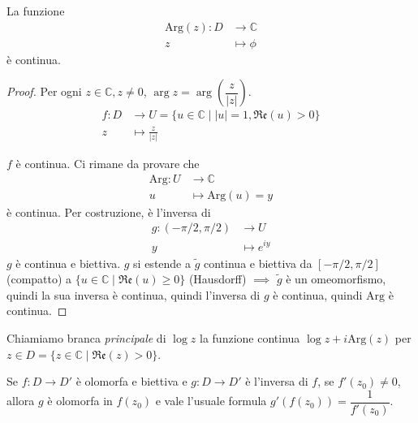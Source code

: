 \begin{prop}
  La funzione
  \begin{align*}
    \text{Arg}(z):D &\longrightarrow \mathbb{C}\\
    z &\longmapsto \phi
  \end{align*}
  è continua.
\end{prop}

\begin{proof}
  Per ogni $z \in \mathbb{C}, z \not=0$, $\arg{z}=\arg{\left(\dfrac{z}{|z|}\right)}$.
  \begin{align*}
    f:D &\longrightarrow U=\{u \in \mathbb{C} \mid |u|=1, \mathfrak{Re}(u)>0\}\\
    z &\longmapsto \frac{z}{|z|}
  \end{align*}
  \begin{center}
  \end{center}
  $f$ è continua. Ci rimane da provare che
  \begin{align*}
    \text{Arg}:U &\longrightarrow \mathbb{C}\\
    u &\longmapsto \text{Arg}(u)=y
  \end{align*}
  è continua.
  Per costruzione, è l'inversa di
  \begin{align*}
    g:(-\pi/2, \pi/2) &\longrightarrow U\\
    y &\longmapsto e^{iy}
  \end{align*}
  $g$ è continua e biettiva. $g$ si estende a $\tilde{g}$ continua e biettiva da $[-\pi/2, \pi/2]$ (compatto) a $\{u \in \mathbb{C} \mid \mathfrak{Re}(u) \ge 0\}$ (Hausdorff) $\implies$ $\tilde{g}$ è un omeomorfismo, quindi la sua inversa è continua, quindi l'inversa di $g$ è continua, quindi $\text{Arg}$ è continua.
\end{proof}

\begin{defn}
  Chiamiamo branca \textit{principale} di $\log{z}$ la funzione continua $\log{z}+i\text{Arg}(z)$ per $z \in D=\{z \in \mathbb{C} \mid \mathfrak{Re}(z)>0\}$.
\end{defn}

\begin{lm} \label{der_inv}
  Se $f:D \longrightarrow D'$ è olomorfa e biettiva e $g:D \longrightarrow D'$ è l'inversa di $f$, se $f'(z_0)\not=0$, allora $g$ è olomorfa in $f(z_0)$ e vale l'usuale formula $g'(f(z_0))=\dfrac{1}{f'(z_0)}$.
\end{lm}

